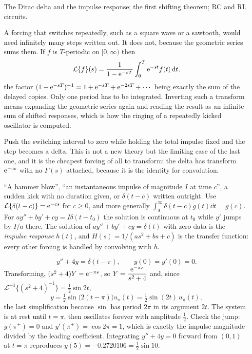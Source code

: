 \begin{seealsob}The Dirac delta and the impulse response; the first shifting theorem; RC and RL circuits.\end{seealsob}

A forcing that switches repeatedly, such as a square wave or a sawtooth, would need infinitely many steps written out. It does not, because the geometric series sums them. If $f$ is $T$-periodic on $[0,\infty)$ then
\[\mathcal{L}\{f\}(s)=\frac{1}{1-\mathrm{e}^{-sT}}\int_0^{T}\mathrm{e}^{-st}f(t)\,\mathrm{d} t,\]
the factor $(1-\mathrm{e}^{-sT})^{-1}=1+\mathrm{e}^{-sT}+\mathrm{e}^{-2sT}+\cdots$ being exactly the sum of the delayed copies. Only one period has to be integrated. Inverting such a transform means expanding the geometric series again and reading the result as an infinite sum of shifted responses, which is how the ringing of a repeatedly kicked oscillator is computed.

Push the switching interval to zero while holding the total impulse fixed and the step becomes a delta. This is not a new theory but the limiting case of the last one, and it is the cheapest forcing of all to transform: the delta has transform $\mathrm{e}^{-cs}$ with no $F(s)$ attached, because it is the identity for convolution.

\cue ``A hammer blow'', ``an instantaneous impulse of magnitude $I$ at time $c$'', a sudden kick with no duration given, or $\delta(t-c)$ written outright.
\method Use $\mathcal{L}\{\delta(t-c)\}=\mathrm{e}^{-cs}$ for $c\ge0$, and more generally $\int_0^{\infty}\delta(t-c)g(t)\dd t=g(c)$. For $ay''+by'+cy=I\delta(t-t_0)$ the solution is continuous at $t_0$ while $y'$ jumps by $I/a$ there. The solution of $ay''+by'+cy=\delta(t)$ with zero data is the \emph{impulse response} $h(t)$, and $H(s)=1/(as^{2}+bs+c)$ is the transfer function: every other forcing is handled by convolving with $h$.

\begin{worked}
\[y''+4y=\delta(t-\pi),\qquad y(0)=y'(0)=0.\]
Transforming, $(s^{2}+4)Y=\mathrm{e}^{-\pi s}$, so $Y=\dfrac{\mathrm{e}^{-\pi s}}{s^{2}+4}$ and, since $\mathcal{L}^{-1}\{(s^{2}+4)^{-1}\}=\tfrac12\sin2t$,
\[y=\tfrac12\sin\bigl(2(t-\pi)\bigr)u_\pi(t)=\tfrac12\sin(2t)\,u_\pi(t),\]
the last simplification because $\sin$ has period $2\pi$ in its argument $2t$. The system is at rest until $t=\pi$, then oscillates forever with amplitude $\tfrac12$. Check the jump: $y(\pi^{+})=0$ and $y'(\pi^{+})=\cos2\pi=1$, which is exactly the impulse magnitude divided by the leading coefficient. Integrating $y''+4y=0$ forward from $(0,1)$ at $t=\pi$ reproduces $y(5)=-0.2720106=\tfrac12\sin10$.
\end{worked}

